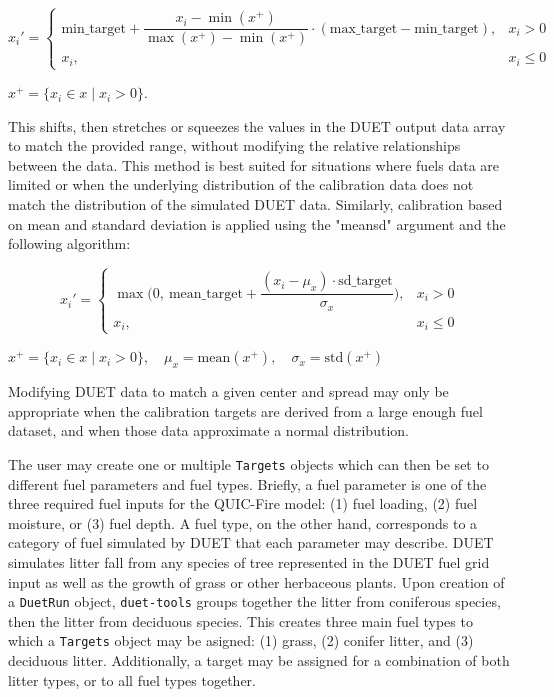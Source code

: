 \documentclass[preprint,12pt,a4paper]{elsarticle}
\begin{document}
\[
x_i' =
\begin{cases}
\text{min\_target} + \dfrac{x_i - \min(x^+)}{\max(x^+) - \min(x^+)} \cdot (\text{max\_target} - \text{min\_target}), & x_i > 0 \\
x_i, & x_i \le 0
\end{cases}
\]

 $ x^+ = \{ x_i \in x \mid x_i > 0 \}. $\newline

This shifts, then stretches or squeezes the values in the DUET output data array to match the provided range, without modifying the relative relationships between the data.
This method is best suited for situations where fuels data are limited or when the underlying distribution of the calibration data does not match the distribution of the simulated DUET data.
Similarly, calibration based on mean and standard deviation is applied using the "meansd" argument and the following algorithm:

\[
x_i' =
\begin{cases}
\max\Bigg( 0, \ \text{mean\_target} + \dfrac{(x_i - \mu_x) \cdot \text{sd\_target}}{\sigma_x} \Bigg), & x_i > 0 \\
x_i, & x_i \le 0
\end{cases}
\]

 $ x^+ = \{ x_i \in x \mid x_i > 0 \}, \quad
\mu_x = \text{mean}(x^+), \quad \sigma_x = \text{std}(x^+) $\newline

Modifying DUET data to match a given center and spread may only be appropriate when the calibration targets are derived from a large enough fuel dataset, and when those data approximate a normal distribution.\newline

The user may create one or multiple \texttt{Targets} objects which can then be set to different fuel parameters and fuel types.
Briefly, a fuel parameter is one of the three required fuel inputs for the QUIC-Fire model: (1) fuel loading, (2) fuel moisture, or (3) fuel depth.
A fuel type, on the other hand, corresponds to a category of fuel simulated by DUET that each parameter may describe.
DUET simulates litter fall from any species of tree represented in the DUET fuel grid input as well as the growth of grass or other herbaceous plants.
Upon creation of a \texttt{DuetRun} object, \texttt{duet-tools} groups together the litter from coniferous species, then the litter from deciduous species.
This creates three main fuel types to which a \texttt{Targets} object may be asigned: (1) grass, (2) conifer litter, and (3) deciduous litter.
Additionally, a target may be assigned for a combination of both litter types, or to all fuel types together.\newline
\end{document}
